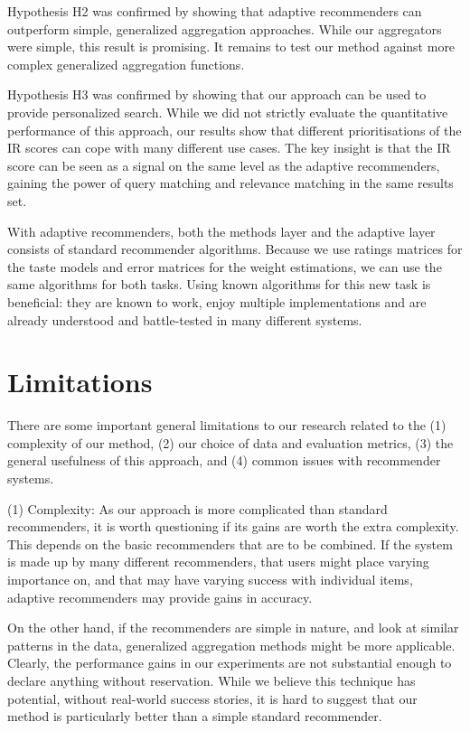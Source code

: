 Hypothesis H2 was confirmed by showing that adaptive recommenders
can outperform simple, generalized aggregation approaches.
While our aggregators were simple,
this result is promising.
It remains to test our method
against more complex generalized aggregation functions.

Hypothesis H3 was confirmed by showing that our approach
can be used to provide personalized search.
While we did not strictly evaluate the quantitative performance
of this approach, our results show that different
prioritisations of the IR scores can cope with many different use cases.
The key insight is that the IR score can be seen as a signal
on the same level as the adaptive recommenders,
gaining the power of query matching and relevance matching
in the same results set.

With adaptive recommenders, both the methods layer and the adaptive layer consists of standard recommender algorithms.
Because we use ratings matrices for the taste models and error matrices for the weight estimations,
we can use the same algorithms for both tasks.
Using known algorithms for this new task is beneficial:
they are known to work, enjoy multiple implementations
and are already understood and battle-tested in many different systems.


\section{Limitations}

There are some important general limitations to our research
related to the 
(1) complexity of our method, 
(2) our choice of data and evaluation metrics, 
(3) the general usefulness of this approach, and
(4) common issues with recommender systems.

(1) Complexity: As our approach is more complicated than standard recommenders,
it is worth questioning if its gains are worth the extra complexity.
This depends on the basic recommenders that are to be combined.
If the system is made up by many different recommenders,
that users might place varying importance on,
and that may have varying success with individual items,
adaptive recommenders may provide gains in accuracy.

On the other hand, if the recommenders are simple in nature,
and look at similar patterns in the data,
generalized aggregation methods might be more applicable.
Clearly, the performance gains in our experiments
are not substantial enough to declare anything without reservation.
While we believe this technique has potential,
without real-world success stories, it is hard
to suggest that our method is particularly better
than a simple standard recommender.

